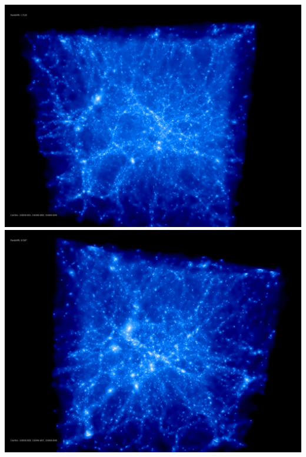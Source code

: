 \includegraphics[scale=0.1]{r256/h100/NGenIC_10629/50.jpg} 
\includegraphics[scale=0.1]{r256/h100/NGenIC_10629/100.jpg}  \\

